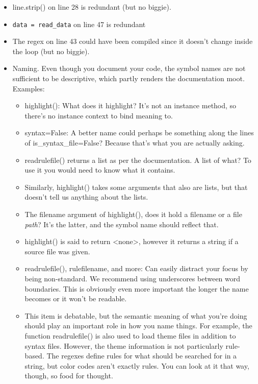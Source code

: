\documentclass[a4paper]{article}
\begin{document}
\begin{itemize}
\item line.strip() on line 28 is redundant (but no biggie).
\item \texttt{data = read_data} on line 47 is redundant
\item The regex on line 43 could have been compiled since it doesn't change inside the loop (but no biggie).
\item Naming. Even though you document your code, the symbol names are not sufficient to be descriptive, which partly renders the documentation moot. Examples:
	\begin{itemize}
    \item highlight(): What does it highlight? It's not an instance method, so there's no instance context to bind meaning to.
    \item syntax=False: A better name could perhaps be something along the lines of is\_syntax\_file=False? Because that's what you are actually asking.
    \item readrulefile() returns a list as per the documentation. A list of what? To use it you would need to know what it contains.
    \item Similarly, highlight() takes some arguments that also are lists, but that doesn't tell us anything about the lists.
    \item The filename argument of highlight(), does it hold a filename or a file \emph{path}? It's the latter, and the symbol name should reflect that.
    \item highlight() is said to return \textless none\textgreater, however it returns a string if a source file was given.
    \item readrulefile(), rulefilename, and more: Can easily distract your focus by being non-standard. We recommend using underscores between word boundaries. This is obviously even more important the longer the name becomes or it won't be readable.
    \item This item is debatable, but the semantic meaning of what you're doing should play an important role in how you name things. For example, the function readrulefile() is also used to load theme files in addition to syntax files. However, the theme information is not particularly rule-based. The regexes define rules for what should be searched for in a string, but color codes aren't exactly rules. You can look at it that way, though, so food for thought.
    \end{itemize}
\end{itemize}
\end{document}
